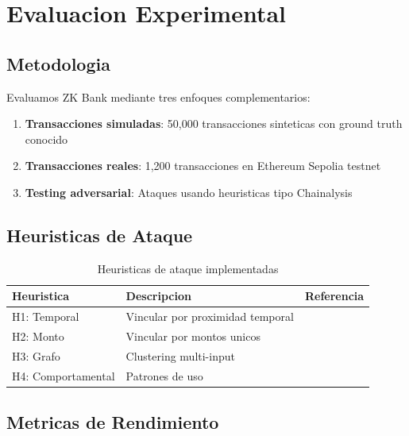 \documentclass[11pt]{article}
\theoremstyle{definition}
\theoremstyle{plain}
\theoremstyle{remark}
\begin{document}
\section{Evaluacion Experimental}
\label{sec:evaluation}

\subsection{Metodologia}

Evaluamos ZK Bank mediante tres enfoques complementarios:
\begin{enumerate}
    \item \textbf{Transacciones simuladas}: 50,000 transacciones sinteticas con ground truth conocido
    \item \textbf{Transacciones reales}: 1,200 transacciones en Ethereum Sepolia testnet
    \item \textbf{Testing adversarial}: Ataques usando heuristicas tipo Chainalysis~\cite{chainalysis2023}
\end{enumerate}

\subsection{Heuristicas de Ataque}

\begin{table}[H]
\centering
\caption{Heuristicas de ataque implementadas}
\label{tab:heuristics}
\begin{tabular}{lll}
\toprule
\textbf{Heuristica} & \textbf{Descripcion} & \textbf{Referencia} \\
\midrule
H1: Temporal & Vincular por proximidad temporal & \cite{moser2013anonymity} \\
H2: Monto & Vincular por montos unicos & \cite{meiklejohn2013fistful} \\
H3: Grafo & Clustering multi-input & \cite{ron2013quantitative} \\
H4: Comportamental & Patrones de uso & \cite{victor2020address} \\
\bottomrule
\end{tabular}
\end{table}

\subsection{Metricas de Rendimiento}
\end{document}
